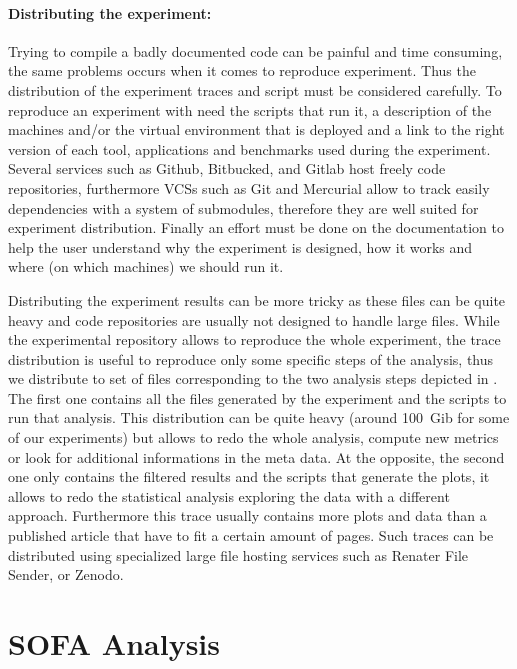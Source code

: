\paragraph{Distributing the experiment:}

Trying to compile a badly documented code can be painful and time consuming,
the same problems occurs when it comes to reproduce experiment. Thus the
distribution of the experiment traces and script must be considered carefully.
To reproduce an experiment with need the scripts that run it, a description of
the machines and/or the virtual environment that is deployed and a link to the
right version of each tool, applications and benchmarks used during the
experiment. Several services such as Github, Bitbucked, and Gitlab 
host freely code repositories, furthermore \glspl{VCS} such as Git and
Mercurial  allow to track easily dependencies with a system
of submodules, therefore they are well suited for experiment distribution.
Finally an effort must be done on the documentation to help the user
understand why the experiment is designed, how it works and where (on which
machines) we should run it.

Distributing the experiment results can be more tricky as these files can be
quite heavy and code repositories are usually not designed to handle large
files. While the experimental repository allows to reproduce the whole
experiment, the trace distribution is useful to reproduce only some specific
steps of the analysis, thus we distribute to set of files corresponding to the
two analysis steps depicted in . The first one contains all
the files generated by the experiment and the scripts to run that analysis.
This distribution can be quite heavy (around \SI{100}{Gib} for some of our
experiments) but allows to redo the whole analysis, compute new metrics or
look for additional informations in the meta data. At the opposite, the second
one only contains the filtered results and the scripts that generate the
plots, it allows to redo the statistical analysis exploring the data with a
different approach. Furthermore this trace usually contains more plots and
data than a published article that have to fit a certain amount of pages. Such
traces can be distributed using specialized large file hosting services such
as Renater File Sender, or Zenodo.


\section{SOFA Analysis}
\label{sec:sofa}


